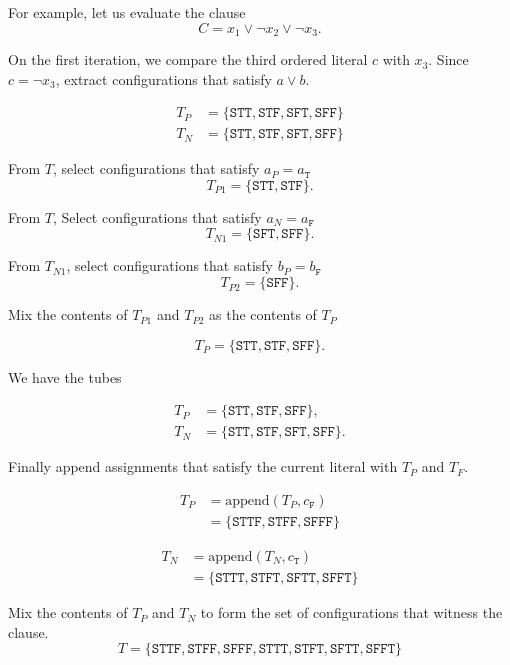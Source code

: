 \noindent For example, let us evaluate the clause
\[
C = x_1 \vee \neg x_2 \vee \neg x_3.
\]

\noindent On the first iteration, we compare the third ordered literal $c$ with $x_3$.  Since $c = \neg x_3$, extract configurations that satisfy $a \vee b$.  

\begin{align*}
T_P &= \{ \texttt{STT}, \texttt{STF}, \texttt{SFT}, \texttt{SFF}\} \\
T_N &= \{ \texttt{STT}, \texttt{STF}, \texttt{SFT}, \texttt{SFF}\} 
\end{align*}

\noindent From $T$, select configurations that satisfy $a_P = a_{\texttt{T}}$
\[
T_{P1} = \{ \texttt{STT}, \texttt{STF} \}.
\]

\noindent From $T$, Select configurations that satisfy $a_N = a_{\texttt{F}}$
\[
T_{N1} = \{ \texttt{SFT}, \texttt{SFF} \}.
\]

\noindent From $T_{N1}$, select configurations that satisfy $b_P = b_{\texttt{F}}$
\[
T_{P2} = \{ \texttt{SFF} \}.
\]

\noindent Mix the contents of $T_{P1}$ and $T_{P2}$ as the contents of $T_P$

\[
T_P = \{ \texttt{STT}, \texttt{STF}, \texttt{SFF} \}.
\]

\noindent We have the tubes

\begin{align*}
T_P &= \{ \texttt{STT}, \texttt{STF}, \texttt{SFF} \}, \\
T_N &= \{ \texttt{STT}, \texttt{STF}, \texttt{SFT}, \texttt{SFF}\}.
\end{align*}

\noindent Finally append assignments that satisfy the current literal with $T_P$ and $T_F$.

\begin{align*}
T_P &= \text{append}(T_P, c_{\texttt{F}}) \\
	&= \{ \texttt{STTF}, \texttt{STFF}, \texttt{SFFF} \}
\end{align*}

\begin{align*}
T_N &= \text{append}(T_N, c_{\texttt{T}}) \\
	&= \{ \texttt{STTT}, \texttt{STFT}, \texttt{SFTT}, \texttt{SFFT}\}
\end{align*}

\noindent Mix the contents of $T_P$ and $T_N$ to form the set of configurations that witness the clause. 
\[
T = \{ \texttt{STTF}, \texttt{STFF}, \texttt{SFFF},  \texttt{STTT}, \texttt{STFT}, \texttt{SFTT}, \texttt{SFFT}\}
\]
		
